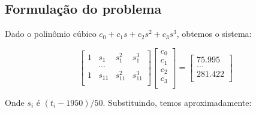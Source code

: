 \documentclass[12pt,a4paper]{article}
\begin{document}
\subsection{Formulação do problema}
Dado o polinômio cúbico $c_0 + c_1s + c_2s^2 + c_3s^3$, obtemos o sistema:

\[
\left[
\begin{array}{cccc}
    1 & s_1 & s_{1}^{2} & s_{1}^{3} \\
      & ... \\
    1 & s_{11} & s_{11}^{2} & s_{11}^{3} \\
\end{array}
\right]
\left[
\begin{array}{c}
    c_0 \\
    c_1 \\
    c_2 \\
    c_3 \\
\end{array}
\right]
=
\left[
\begin{array}{c}
    75.995 \\
    ... \\
    281.422 \\
\end{array}
\right]
\]

Onde $s_i$ é $(t_i-1950)/50$. Substituindo, temos aproximadamente:
\end{document}
